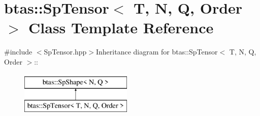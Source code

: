 \hypertarget{classbtas_1_1_sp_tensor}{
\section{btas::SpTensor$<$ T, N, Q, Order $>$ Class Template Reference}
\label{classbtas_1_1_sp_tensor}
}


{\ttfamily \#include $<$SpTensor.hpp$>$}Inheritance diagram for btas::SpTensor$<$ T, N, Q, Order $>$::\begin{figure}[H]
\begin{center}
\leavevmode
\includegraphics[height=2cm]{classbtas_1_1_sp_tensor}
\end{center}
\end{figure}
